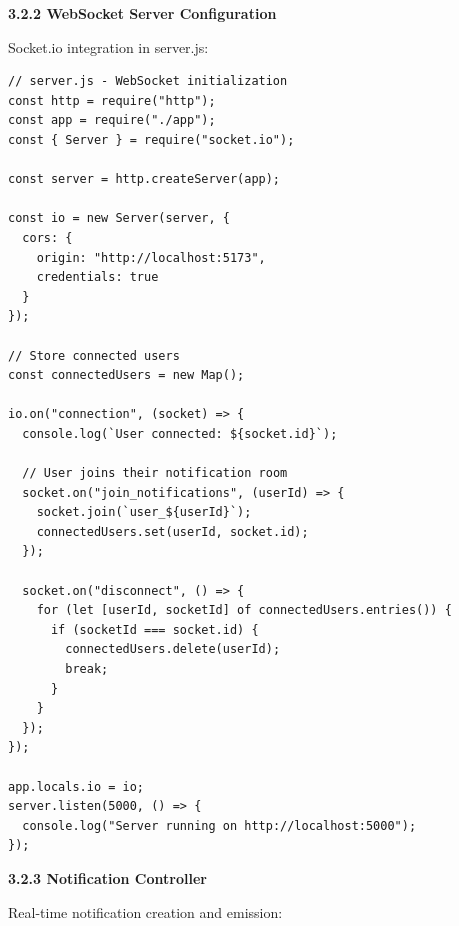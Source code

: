 \documentclass[12pt]{report}
\begin{document}
\textbf{3.2.2 WebSocket Server Configuration}

Socket.io integration in server.js:

\begin{lstlisting}
// server.js - WebSocket initialization
const http = require("http");
const app = require("./app");
const { Server } = require("socket.io");

const server = http.createServer(app);

const io = new Server(server, {
  cors: {
    origin: "http://localhost:5173",
    credentials: true
  }
});

// Store connected users
const connectedUsers = new Map();

io.on("connection", (socket) => {
  console.log(`User connected: ${socket.id}`);

  // User joins their notification room
  socket.on("join_notifications", (userId) => {
    socket.join(`user_${userId}`);
    connectedUsers.set(userId, socket.id);
  });

  socket.on("disconnect", () => {
    for (let [userId, socketId] of connectedUsers.entries()) {
      if (socketId === socket.id) {
        connectedUsers.delete(userId);
        break;
      }
    }
  });
});

app.locals.io = io;
server.listen(5000, () => {
  console.log("Server running on http://localhost:5000");
});
\end{lstlisting}

\textbf{3.2.3 Notification Controller}

Real-time notification creation and emission:
\end{document}
